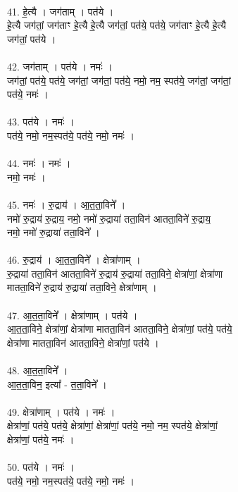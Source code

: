 \\
41. हे॒त्यै । जग॑ताम् । पत॑ये ।\\
हे॒त्यै जग॑तां॒ जग॑ताꣳ हे॒त्यै हे॒त्यै जग॑तां॒ पत॑ये॒ पत॑ये॒ जग॑ताꣳ हे॒त्यै हे॒त्यै\\
जग॑तां॒ पत॑ये ।\\
\\
42. जग॑ताम् । पत॑ये । नमः॑ ।\\
जग॑तां॒ पत॑ये॒ पत॑ये॒ जग॑तां॒ जग॑तां॒ पत॑ये॒ नमो॒ नम॒ स्पत॑ये॒ जग॑तां॒ जग॑तां॒\\
पत॑ये॒ नमः॑ ।\\
\\
43. पत॑ये । नमः॑ ।\\
पत॑ये॒ नमो॒ नम॒स्पत॑ये॒ पत॑ये॒ नमो॒ नमः॑ ।\\
\\
44. नमः॑ । नमः॑ ।\\
नमो॒ नमः॑ ।\\
\\
45. नमः॑ । रु॒द्राय॑ । आ॒त॒ता॒विने᳚ ।\\
नमो॑ रु॒द्राय॑ रु॒द्राय॒ नमो॒ नमो॑ रु॒द्राया॑ तता॒विन॑ आतता॒विने॑ रु॒द्राय॒\\
नमो॒ नमो॑ रु॒द्राया॑ तता॒विने᳚ ।\\
\\
46. रु॒द्राय॑ । आ॒त॒ता॒विने᳚ । क्षेत्रा॑णाम् ।\\
रु॒द्राया॑ तता॒विन॑ आतता॒विने॑ रु॒द्राय॑ रु॒द्राया॑ तता॒विने॒ क्षेत्रा॑णां॒ क्षेत्रा॑णा\\
मातता॒विने॑ रु॒द्राय॑ रु॒द्राया॑ तता॒विने॒ क्षेत्रा॑णाम् ।\\
\\
47. आ॒त॒ता॒विने᳚ । क्षेत्रा॑णाम् । पत॑ये ।\\
आ॒त॒ता॒विने॒ क्षेत्रा॑णां॒ क्षेत्रा॑णा मातता॒विन॑ आतता॒विने॒ क्षेत्रा॑णां॒ पत॑ये॒ पत॑ये॒\\
क्षेत्रा॑णा मातता॒विन॑ आतता॒विने॒ क्षेत्रा॑णां॒ पत॑ये ।\\
\\
48. आ॒त॒ता॒विने᳚ ।\\
आ॒त॒ता॒विन॒ इत्या᳚ - त॒ता॒विने᳚ ।\\
\\
49. क्षेत्रा॑णाम् । पत॑ये । नमः॑ ।\\
क्षेत्रा॑णां॒ पत॑ये॒ पत॑ये॒ क्षेत्रा॑णां॒ क्षेत्रा॑णां॒ पत॑ये॒ नमो॒ नम॒ स्पत॑ये॒ क्षेत्रा॑णां॒\\
क्षेत्रा॑णां॒ पत॑ये॒ नमः॑ ।\\
\\
50. पत॑ये । नमः॑ ।\\
पत॑ये॒ नमो॒ नम॒स्पत॑ये॒ पत॑ये॒ नमो॒ नमः॑ ।\\
